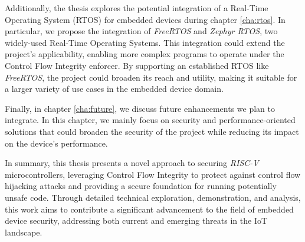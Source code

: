 Additionally, the thesis explores the potential integration of a Real-Time Operating
System (RTOS) for embedded devices during chapter \ref{cha:rtos}. In particular,
we propose the integration of \textit{FreeRTOS} and \textit{Zephyr RTOS}, two
widely-used Real-Time Operating Systems. This integration could extend the project's
applicability, enabling more complex programs to operate under the Control Flow
Integrity enforcer. By supporting an established RTOS like \textit{FreeRTOS}, the
project could broaden its reach and utility, making it suitable for a larger
variety of use cases in the embedded device domain.

Finally, in chapter \ref{cha:future}, we discuss future enhancements we plan to
integrate. In this chapter, we mainly focus on security and performance-oriented
solutions that could broaden the security of the project while reducing its
impact on the device's performance.

In summary, this thesis presents a novel approach to securing \textit{RISC-V}
microcontrollers, leveraging Control Flow Integrity to protect against control flow
hijacking attacks and providing a secure foundation for running potentially unsafe
code. Through detailed technical exploration, demonstration, and analysis, this work
aims to contribute a significant advancement to the field of embedded device security,
addressing both current and emerging threats in the IoT landscape.
